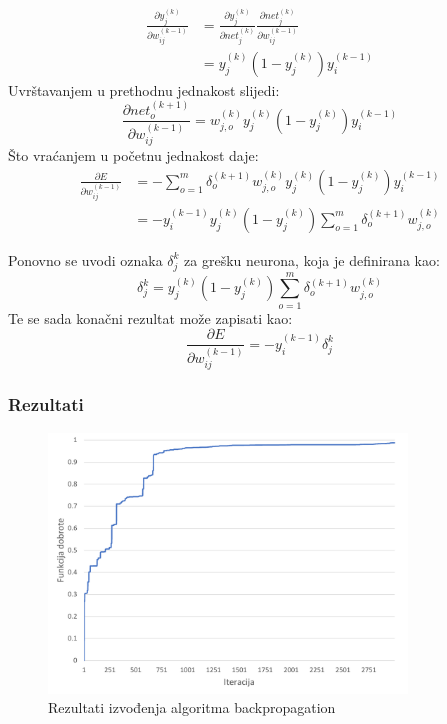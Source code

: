 \documentclass[times, utf8, zavrsni, numeric]{fer}
\begin{document}
\begin{equation*}
\begin{split}
    \frac{\partial y_j^{(k)}}{\partial w_{ij}^{(k-1)}}
        & = \frac{\partial y_j^{(k)}}{\partial net_{j}^{(k)}}
            \frac{\partial net_{j}^{(k)}}{\partial w_{ij}^{(k-1)}}\\
        & = y_j^{(k)} (1 - y_j^{(k)}) y_i^{(k - 1)}
\end{split}
\end{equation*}
Uvrštavanjem u prethodnu jednakost slijedi:
\[
    \frac{\partial net_o^{(k + 1)}}{\partial w_{ij}^{(k-1)}}
        = w_{j,o}^{(k)}y_j^{(k)} (1 - y_j^{(k)}) y_i^{(k - 1)}
\]
Što vraćanjem u početnu jednakost daje:
\begin{equation*}
\begin{split}
    \frac{\partial E}{\partial w_{ij}^{(k-1)}}
        & = -\displaystyle\sum_{o = 1}^m\delta_o^{(k+1)}w_{j,o}^{(k)}y_j^{(k)} (1 - y_j^{(k)}) y_i^{(k - 1)}\\
        & = -y_i^{(k - 1)} y_j^{(k)} (1 - y_j^{(k)})\displaystyle\sum_{o = 1}^m\delta_o^{(k+1)}w_{j,o}^{(k)}
\end{split}
\end{equation*}

Ponovno se uvodi oznaka $\delta_j^{k}$ za grešku neurona, koja je definirana kao:
\[
    \delta_j^{k} = y_j^{(k)} (1 - y_j^{(k)})\displaystyle\sum_{o = 1}^m\delta_o^{(k+1)}w_{j,o}^{(k)} 
\]
Te se sada konačni rezultat može zapisati kao:
\[
    \frac{\partial E}{\partial w_{ij}^{(k-1)}} =
    -y_i^{(k - 1)}\delta_j^{k}
\]

\subsubsection{Rezultati}
\begin{figure}[ht!]
    \centering
    \includegraphics[width=0.85\textwidth]{Images/Backprop.pdf}
    \captionsetup{justification=centering}
    \caption{Rezultati izvođenja algoritma backpropagation}
    \label{fig:backprop}
\end{figure}
\end{document}
